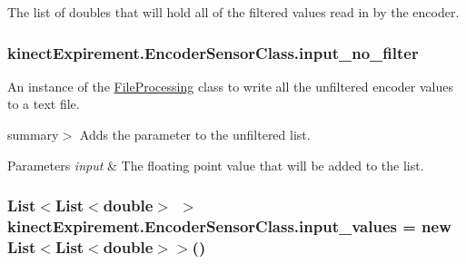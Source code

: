 The list of doubles that will hold all of the filtered values read in by the encoder. 

\subsubsection[{\texorpdfstring{input\+\_\+no\+\_\+filter}{input_no_filter}}]{ kinect\+Expirement.\+Encoder\+Sensor\+Class.\+input\+\_\+no\+\_\+filter\hspace{0.3cm}{\ttfamily [static]}}\hypertarget{classkinect_expirement_1_1_encoder_sensor_class_a37bd8f02067e70fcb1ae1c2a97e86aed}{}\label{classkinect_expirement_1_1_encoder_sensor_class_a37bd8f02067e70fcb1ae1c2a97e86aed}


An instance of the {\ttfamily \hyperlink{classkinect_expirement_1_1_file_processing}{File\+Processing}} class to write all the unfiltered encoder values to a text file. 

summary$>$ Adds the parameter to the unfiltered list. 


\begin{DoxyParams}{Parameters}
{\em input} & The floating point value that will be added to the list. \\
\hline
\end{DoxyParams}
\subsubsection[{\texorpdfstring{input\+\_\+values}{input_values}}]{\setlength{\rightskip}{0pt plus 5cm}List$<$List$<$double$>$ $>$ kinect\+Expirement.\+Encoder\+Sensor\+Class.\+input\+\_\+values = new List$<$List$<$double$>$$>$()\hspace{0.3cm}{\ttfamily [static]}}\hypertarget{classkinect_expirement_1_1_encoder_sensor_class_a8f77045a1820ffa39d9d162a404938ff}{}\label{classkinect_expirement_1_1_encoder_sensor_class_a8f77045a1820ffa39d9d162a404938ff}


